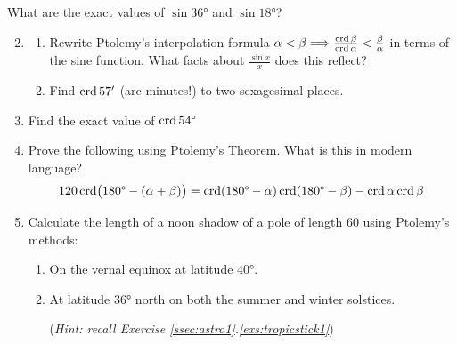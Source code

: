 


\begin{exercises}{}{}
	\exstart What are the exact values of $\sin\ang{36}$ and $\sin\ang{18}$?
	
	\begin{enumerate}\setcounter{enumi}{1}
	  \item\begin{enumerate}
	    \item Rewrite Ptolemy's interpolation formula $\alpha<\beta\Longrightarrow \frac{\crd\beta}{\crd\alpha}<\frac\beta\alpha$ in terms of the sine function. What facts about $\frac{\sin x}x$ does this reflect?
	    \item Find $\crd 57'$ (arc-minutes!) to two sexagesimal places.
	  \end{enumerate} 
	  
	  \item Find the exact value of $\crd \ang{54}$
	  
	  \item%
	  Prove the following using Ptolemy's Theorem. What is this in modern language?
	  \[
	  	120\crd\bigl(\ang{180}-(\alpha+\beta)\bigr) =\crd(\ang{180}-\alpha)\crd(\ang{180}-\beta)-\crd\alpha\crd\beta
	  \]
	  
	  
	  \item%
	  Calculate the length of a noon shadow of a pole of length 60 using Ptolemy's methods:
	  \begin{enumerate}
	    \item On the vernal equinox at latitude $\ang{40}$.
	  	\item%
	  	At latitude \ang{36} north on both the summer and winter solstices.\par
	  (\emph{Hint: recall Exercise \ref*{ssec:astro1}.\ref{exs:tropicstick1}})
	  \end{enumerate}
	\end{enumerate}
\end{exercises}